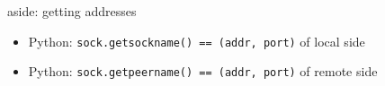 \begin{frame}{aside: getting addresses}
\begin{itemize}
\item Python: \texttt{sock.getsockname() == (addr, port)} of local side
\item Python: \texttt{sock.getpeername() == (addr, port)} of remote side
\end{itemize}
\end{frame}

